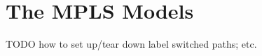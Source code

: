 \chapter{The MPLS Models}
\label{cha:mpls}

TODO how to set up/tear down label switched paths; etc.



